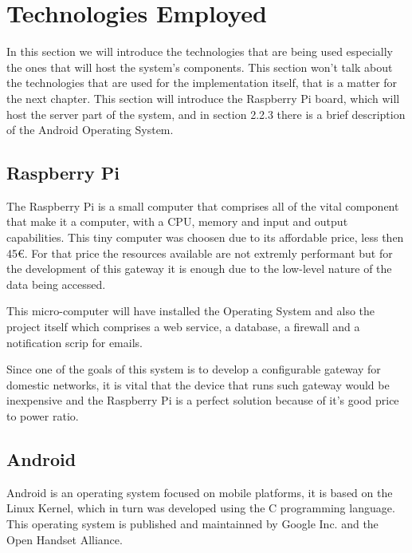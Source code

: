 
\section{Technologies Employed}
\label{chap2:sec:tech}
In this section we will introduce the technologies that are being used
especially the ones that will host the system's components. This section won't
talk about the technologies that are used for the implementation itself, that is
a matter for the next chapter. This section will introduce the Raspberry Pi
board, which will host the server part of the system, and in section 2.2.3 there
is a brief description of the Android Operating System.

\subsection{Raspberry Pi}
\label{chap2:sec:tech:rasp}
The Raspberry Pi is a small computer that comprises all of the vital component
that make it a computer, with a CPU, memory and input and output capabilities.
This tiny computer was choosen due to its affordable price, less then 45€. For
that price the resources available are not extremly performant but for the
development of this gateway it is enough due to the low-level nature of the data
being accessed.

This micro-computer will have installed the Operating System and also the
project itself which comprises a web service, a database, a firewall and a
notification scrip for emails.

Since one of the goals of this system is to develop a configurable gateway for
domestic networks, it is vital that the device that runs such gateway would be
inexpensive and the Raspberry Pi is a perfect solution because of it's good
price to power ratio.

\subsection{Android}
\label{chap2:sec:tech:android}
Android is an operating system focused on mobile platforms, it is based on the
Linux Kernel, which in turn was developed using the C programming language. This
operating system is published and maintainned by Google Inc. and the Open
Handset Alliance.


